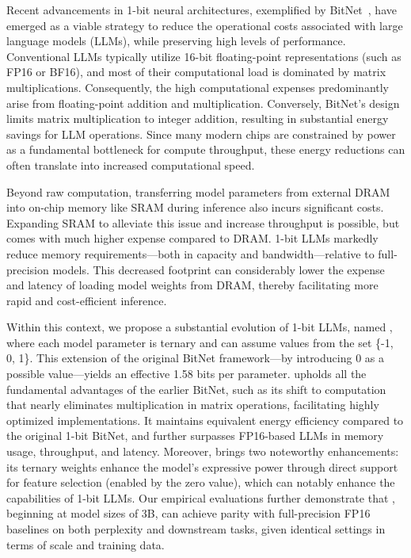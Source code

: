 Recent advancements in 1-bit neural architectures, exemplified by BitNet~\cite{bitnet}, have emerged as a viable strategy to reduce the operational costs associated with large language models (LLMs), while preserving high levels of performance. Conventional LLMs typically utilize 16-bit floating-point representations (such as FP16 or BF16), and most of their computational load is dominated by matrix multiplications. Consequently, the high computational expenses predominantly arise from floating-point addition and multiplication. Conversely, BitNet's design limits matrix multiplication to integer addition, resulting in substantial energy savings for LLM operations. Since many modern chips are constrained by power as a fundamental bottleneck for compute throughput, these energy reductions can often translate into increased computational speed.

Beyond raw computation, transferring model parameters from external DRAM into on-chip memory like SRAM during inference also incurs significant costs. Expanding SRAM to alleviate this issue and increase throughput is possible, but comes with much higher expense compared to DRAM. 1-bit LLMs markedly reduce memory requirements—both in capacity and bandwidth—relative to full-precision models. This decreased footprint can considerably lower the expense and latency of loading model weights from DRAM, thereby facilitating more rapid and cost-efficient inference.

Within this context, we propose a substantial evolution of 1-bit LLMs, named \textbf{}, where each model parameter is ternary and can assume values from the set \{-1, 0, 1\}. This extension of the original BitNet framework—by introducing 0 as a possible value—yields an effective 1.58 bits per parameter.  upholds all the fundamental advantages of the earlier BitNet, such as its shift to computation that nearly eliminates multiplication in matrix operations, facilitating highly optimized implementations. It maintains equivalent energy efficiency compared to the original 1-bit BitNet, and further surpasses FP16-based LLMs in memory usage, throughput, and latency. Moreover,  brings two noteworthy enhancements: its ternary weights enhance the model’s expressive power through direct support for feature selection (enabled by the zero value), which can notably enhance the capabilities of 1-bit LLMs. Our empirical evaluations further demonstrate that , beginning at model sizes of 3B, can achieve parity with full-precision FP16 baselines on both perplexity and downstream tasks, given identical settings in terms of scale and training data.

